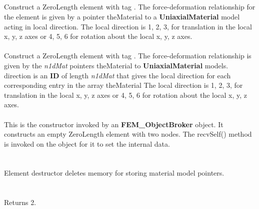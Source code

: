  \\
 \\
    


  \\
 \\
Construct a ZeroLength element with \p tag .
The force-deformation relationship for the element is given by a pointer \p theMaterial to a
{\bf UniaxialMaterial} model acting in local \p direction.
The local \p direction is 1, 2, 3, for translation in the local x, y, z axes or 4, 5, 6 
for rotation about the local x, y, z axes. 
\\

 \\
Construct a ZeroLength element with \p tag .
The force-deformation relationship is given by the {\em n1dMat} pointers
\p theMaterial to {\bf UniaxialMaterial} models. 
\p direction is an {\bf ID}  of length {\em n1dMat} that gives
the local direction for each corresponding entry in the array \p theMaterial
The local \p direction is 1, 2, 3, for translation in the local x, y, z axes or 4, 5, 6 
for rotation about the local x, y, z axes. 
\\

 \\ 
This is the constructor invoked by an {\bf FEM\_ObjectBroker} object. It
constructs an empty ZeroLength element with two nodes.
The recvSelf() method is
invoked on the object for it to set the internal data. 
\\

 \\
 \\ 
Element destructor deletes memory for storing material model pointers. 
\\

  \\
 \\
Returns 2.
\\

